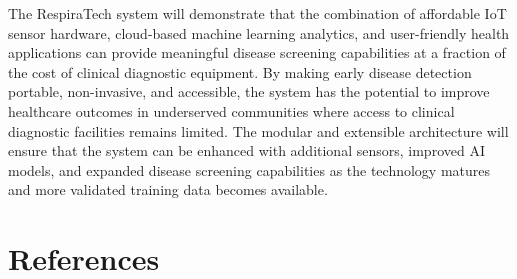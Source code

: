 The RespiraTech system will demonstrate that the combination of affordable IoT sensor hardware, cloud-based machine learning analytics, and user-friendly health applications can provide meaningful disease screening capabilities at a fraction of the cost of clinical diagnostic equipment. By making early disease detection portable, non-invasive, and accessible, the system has the potential to improve healthcare outcomes in underserved communities where access to clinical diagnostic facilities remains limited. The modular and extensible architecture will ensure that the system can be enhanced with additional sensors, improved AI models, and expanded disease screening capabilities as the technology matures and more validated training data becomes available.

\chapter{References}

